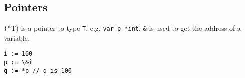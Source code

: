 \subsection {Pointers}
\texttt(*T) is a pointer to type \texttt{T}. e.g. \texttt{var p *int}.
\texttt{\&} is used to get the address of a variable.
\begin{lstlisting}
i := 100
p := \&i
q := *p // q is 100
\end{lstlisting}
